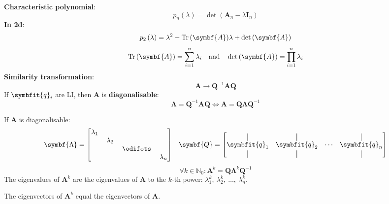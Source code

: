 \documentclass{article}
\begin{document}
\begin{minipage}[t]{126.1962963mm}
\begin{multicols*}{2}
        \textbf{Characteristic polynomial}:
        \begin{equation*}
            p_n\left(\lambda\right) = \det{\left( \symbf{A}_n - \lambda\symbf{I}_n \right)}
        \end{equation*}
        \textbf{In 2d}:
        \begin{equation*}
            p_2\left(\lambda\right) = \lambda^2-\tr{\left( \symbf{A} \right)}\lambda + \det{\left( \symbf{A} \right)}
        \end{equation*}
        \begin{equation*}
            \tr{\left( \symbf{A} \right)} = \sum_{i=1}^n \lambda_i \quad \text{and} \quad
            \det{\left( \symbf{A} \right)} = \prod_{i=1}^n \lambda_i
        \end{equation*}
        \textbf{Similarity transformation}:
        \begin{equation*}
            \symbf{A}\rightarrow \symbf{Q}^{-1}\symbf{A}\symbf{Q}
        \end{equation*}
        If \(\symbfit{q}_i\) are LI, then \(\symbf{A}\) is
        \textbf{diagonalisable}:
        \begin{equation*}
            \symbf{\Lambda}=\symbf{Q}^{-1}\symbf{A}\symbf{Q} \iff \symbf{A}=\symbf{Q}\symbf{\Lambda}\symbf{Q}^{-1}
        \end{equation*}
    \end{multicols*}
    If \(\symbf{A}\) is diagonalisable:
    \begin{equation*}
        \symbf{\Lambda}=\mqty[\dmat{\lambda_1,\: \lambda_2,\: \odifots,\: \lambda_n}] \quad
        \symbf{Q}=\mqty[\vertbar & \vertbar & & \vertbar \\ \symbfit{q}_1 &
            \symbfit{q}_2 & \cdots & \symbfit{q}_n \\ \vertbar & \vertbar & & \vertbar]
    \end{equation*}
    \begin{equation*}
        \forall k \in \mathbb{N}_0:\symbf{A}^k = \symbf{Q} \symbf{\Lambda}^k \symbf{Q}^{-1}
    \end{equation*}
    The eigenvalues of \(\symbf{A}^k\) are the eigenvalues of \(\symbf{A}\)
    to the \(k\)-th power: \(\lambda_1^k,\: \lambda_2^k,\: \dots,\: \lambda_n^k\).

    The eigenvectors of \(\symbf{A}^k\) equal the eigenvectors of \(\symbf{A}\).
\end{minipage}
\end{document}
